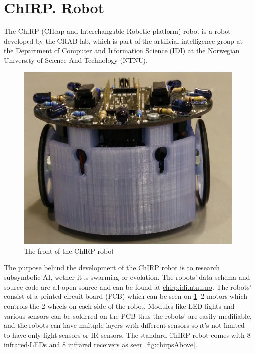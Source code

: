 \section{ChIRP. Robot}
The ChIRP (CHeap and Interchangable Robotic platform) robot is a robot developed by the CRAB lab, which is part of the artificial intelligence group at the Department of Computer and Information Science (IDI) at the Norwegian University of Science And Technology (NTNU).
\begin{figure}[h]
\label{fig:chirpsFront}
\centering
\includegraphics[width=0.8\linewidth]{images/chirpFront.jpg}
\caption{The front of the ChIRP robot}
\end{figure}
The purpose behind the development of the ChIRP robot is to research subsymbolic AI, wether it is swarming or evolution.
The robots' data schema and source code are all open source and can be found at \href{http://chirp.idi.ntnu.no}{chirp.idi.ntnu.no}. The robots' consist of a printed circuit board (PCB) which can be seen on \ref{fig:chirpsFront}, 2 motors which controls the 2 wheels on each side of the robot.
Modules like LED lights and various sensors can be soldered on the PCB thus the robots' are easily modifiable, and the robots can have multiple layers with different sensors so it's not limited to have only light sensors or IR sensors. The standard ChIRP robot comes with 8 infrared-LEDs and 8 infrared receivers as seen \ref{fig:chirpsAbove}.
